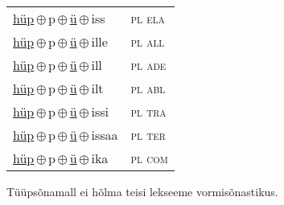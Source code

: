 \begin{minipage}{\textwidth}
\begin{sideways}
\begin{tabular}{l l}
\underline{hüp}\,$\oplus$\,p\,$\oplus$\,\underline{ü}\,$\oplus$\,iss & \textsc{ pl ela } \\
\underline{hüp}\,$\oplus$\,p\,$\oplus$\,\underline{ü}\,$\oplus$\,ille & \textsc{ pl all } \\
\underline{hüp}\,$\oplus$\,p\,$\oplus$\,\underline{ü}\,$\oplus$\,ill & \textsc{ pl ade } \\
\underline{hüp}\,$\oplus$\,p\,$\oplus$\,\underline{ü}\,$\oplus$\,ilt & \textsc{ pl abl } \\
\underline{hüp}\,$\oplus$\,p\,$\oplus$\,\underline{ü}\,$\oplus$\,issi & \textsc{ pl tra } \\
\underline{hüp}\,$\oplus$\,p\,$\oplus$\,\underline{ü}\,$\oplus$\,issaa & \textsc{ pl ter } \\
\underline{hüp}\,$\oplus$\,p\,$\oplus$\,\underline{ü}\,$\oplus$\,ika & \textsc{ pl com } \\
\end{tabular}
\end{sideways}
\label{tab:tüüpsõnamall-hüppü}

\end{minipage}

 
\vspace{1em}
\noindent Tüüpsõnamall  ei hõlma teisi lekseeme vormi\-sõnastikus.
